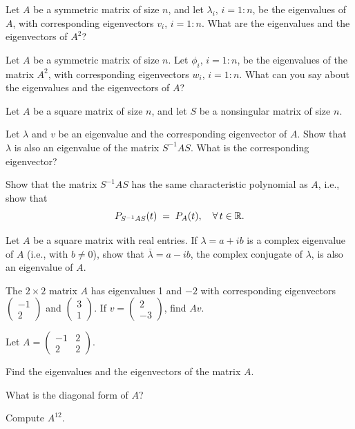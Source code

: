 \begin{exercises}
\item
\begin{subparts}
\item Let $A$ be a symmetric matrix of size $n$, and let $\lambda_i$, $i =
1:n$, be the eigenvalues of $A$, with corresponding eigenvectors $v_i$, $i =
1:n$. What are the eigenvalues and the eigenvectors of $A^2$?
\item Let $A$ be a symmetric matrix of size $n$. Let $\phi_i$, $i = 1:n$, be
the eigenvalues of the matrix $A^2$, with corresponding eigenvectors $w_i$, $i
= 1:n$. What can you say about the eigenvalues and the eigenvectors of $A$?
\end{subparts}

\item Let $A$ be a square matrix of size $n$, and let $S$ be a nonsingular
matrix of size $n$.
\begin{subparts}
\item Let $\lambda$ and $v$ be an eigenvalue and the corresponding
eigenvector of $A$. Show that $\lambda$ is also an eigenvalue of the matrix
$S^{-1}AS$. What is the corresponding eigenvector?
\item Show that the matrix $S^{-1}AS$ has the same characteristic polynomial
as $A$, i.e., show that
\[
P_{S^{-1}AS}(t) \;=\; P_A(t), \quad \forall\, t \in \mathbb{R}.
\]
\end{subparts}

\item Let $A$ be a square matrix with real entries. If $\lambda = a + ib$ is a
complex eigenvalue of $A$ (i.e., with $b \neq 0$), show that $\overline{\lambda}
= a - ib$, the complex conjugate of $\lambda$, is also an eigenvalue of $A$.

\item The $2 \times 2$ matrix $A$ has eigenvalues 1 and $-2$ with
corresponding eigenvectors $\begin{pmatrix} -1\\ 2 \end{pmatrix}$ and
$\begin{pmatrix} 3\\ 1 \end{pmatrix}$. If $v = \begin{pmatrix} 2\\ -3
\end{pmatrix}$, find $Av$.

\item Let $A = \begin{pmatrix} -1 & 2\\ 2 & 2 \end{pmatrix}$.
\begin{subparts}
\item Find the eigenvalues and the eigenvectors of the matrix $A$.
\item What is the diagonal form of $A$?
\item Compute $A^{12}$.
\end{subparts}


\end{exercises}
